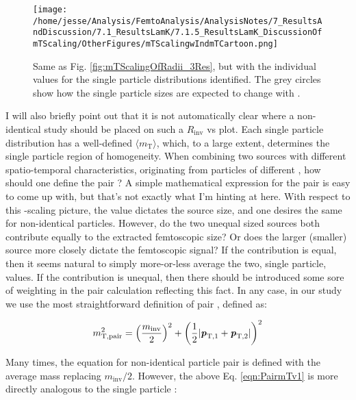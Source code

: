 \documentclass[/home/jesse/Analysis/FemtoAnalysis/AnalysisNotes/AnalysisNoteJBuxton.tex]{subfiles}
\begin{document}
\begin{figure}[h]
  \centering
  \texttt{[image: /home/jesse/Analysis/FemtoAnalysis/AnalysisNotes/7\_ResultsAndDiscussion/7.1\_ResultsLamK/7.1.5\_ResultsLamK\_DiscussionOfmTScaling/OtherFigures/mTScalingwIndmTCartoon.png]}
  \caption[$m_{\mathrm{T}}$ Scaling of Radii: 3 Residuals in Fit (with individual \mt highlighted)]{Same as Fig. \ref{fig:mTScalingOfRadii_3Res}, but with the individual \mt values for the single particle distributions identified.  The grey circles show how the single particle sizes are expected to change with \mt.}
  \label{fig:mTScalingOfRadii_3ReswIndmTCartoon}
\end{figure}


I will also briefly point out that it is not automatically clear where a non-identical study should be placed on such a $R_{\mathrm{inv}}$ vs \mt plot.
Each single particle distribution has a well-defined $\langle m_{\mathrm{T}} \rangle$, which, to a large extent, determines the single particle region of homogeneity.
When combining two sources with different spatio-temporal characteristics, originating from particles of different \mt, how should one define the pair \mt?
A simple mathematical expression for the pair \mt is easy to come up with, but that's not exactly what I'm hinting at here.
With respect to this \mt-scaling picture, the \mt value dictates the source size, and one desires the same for non-identical particles.
However, do the two unequal sized sources both contribute equally to the extracted femtoscopic size?
Or does the larger (smaller) source more closely dictate the femtoscopic signal?
If the contribution is equal, then it seems natural to simply more-or-less average the two, single particle, \mt values.
If the contribution is unequal, then there should be introduced some sore of weighting in the pair \mt calculation reflecting this fact.
In any case, in our study we use the most straightforward definition of pair \mt, defined as:


\begin{equation}
 m_{\mathrm{T, pair}}^{2} = \left( \frac{m_{\mathrm{inv}}}{2} \right)^{2} + \left( \frac{1}{2} |\textbf{\textit{p}}_{\mathrm{T,1}} + \textbf{\textit{p}}_{\mathrm{T,2}}| \right)^{2}
\label{eqn:PairmTv1}
\end{equation}

Many times, the equation for non-identical particle pair \mt is defined with the average mass replacing $m_{\mathrm{inv}}/2$.  However, the above Eq. \ref{eqn:PairmTv1} is more directly analogous to the single particle \mt:
\end{document}
